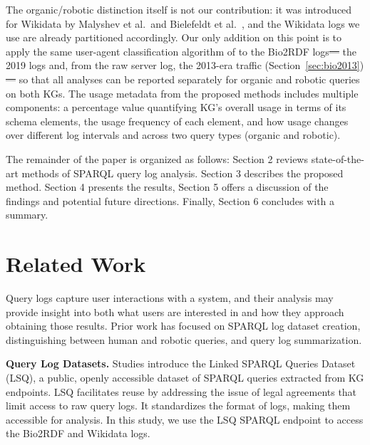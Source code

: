 \documentclass[sw]{iosart2x}
\providecommand{\DIFadd}[1]{{\protect\color{blue}\uwave{#1}}} %
\providecommand{\DIFdel}[1]{{\protect\color{red}\sout{#1}}} %
\providecommand{\DIFaddbegin}{} %
\providecommand{\DIFaddend}{} %
\providecommand{\DIFdelbegin}{} %
\providecommand{\DIFdelend}{} %
\providecommand{\DIFscaledelfig}{0.5}
\newlength{\DIFdelgraphicswidth} %
\newlength{\DIFdelgraphicsheight} %
\providecommand{\DIFaddincludegraphics}[2][]{{\color{blue}\fbox{\DIFOincludegraphics[#1]{#2}}}} %
\providecommand{\DIFdelincludegraphics}[2][]{%
\sbox{\DIFdelgraphicsbox}{\DIFOincludegraphics[#1]{#2}}%
\settoboxwidth{\DIFdelgraphicswidth}{\DIFdelgraphicsbox} %
\settoboxtotalheight{\DIFdelgraphicsheight}{\DIFdelgraphicsbox} %
\scalebox{\DIFscaledelfig}{%
\parbox[b]{\DIFdelgraphicswidth}{\usebox{\DIFdelgraphicsbox}\\[-\baselineskip] \rule{\DIFdelgraphicswidth}{0em}}\llap{\resizebox{\DIFdelgraphicswidth}{\DIFdelgraphicsheight}{%
\setlength{\unitlength}{\DIFdelgraphicswidth}%
\begin{picture}(1,1)%
\thicklines\linethickness{2pt} %
{\color[rgb]{1,0,0}\put(0,0){\framebox(1,1){}}}%
{\color[rgb]{1,0,0}\put(0,0){\line( 1,1){1}}}%
{\color[rgb]{1,0,0}\put(0,1){\line(1,-1){1}}}%
\end{picture}%
}\hspace*{3pt}}} %
} %
\DeclareRobustCommand{\DIFaddbegin}{\DIFOaddbegin \let\includegraphics\DIFaddincludegraphics} %
\DeclareRobustCommand{\DIFaddend}{\DIFOaddend \let\includegraphics\DIFOincludegraphics} %
\DeclareRobustCommand{\DIFdelbegin}{\DIFOdelbegin \let\includegraphics\DIFdelincludegraphics} %
\DeclareRobustCommand{\DIFdelend}{\DIFOaddend \let\includegraphics\DIFOincludegraphics} %
\begin{document}
The organic/robotic distinction itself is not our contribution: it was introduced for Wikidata by Malyshev et al.\ and Bielefeldt et al.\ \cite{malyshev2018getting,bielefeldt2018practical}, and the Wikidata logs we use are already partitioned accordingly. Our only addition on this point is to apply the same user-agent classification algorithm of \cite{bielefeldt2018practical} to the Bio2RDF logs\DIFdelbegin \DIFdel{--- }\DIFdelend \DIFaddbegin \DIFadd{, }\DIFaddend the 2019 logs and, from the raw server log, the 2013-era traffic (Section~\ref{sec:bio2013})\DIFdelbegin \DIFdel{--- }\DIFdelend \DIFaddbegin \DIFadd{, }\DIFaddend so that all analyses can be reported separately for organic and robotic queries on both KGs.
The usage metadata from the proposed methods includes multiple components: a percentage value quantifying KG's overall usage in terms of its schema elements, the usage frequency of each element, and how usage changes over different log intervals and across two query types (organic and robotic).

The remainder of the paper is organized as follows: Section 2 reviews state-of-the-art methods of SPARQL query log analysis. Section 3 describes the proposed method. Section 4 presents the results, Section 5 offers a discussion of the findings and potential future directions. Finally, Section 6 concludes with a summary.

\section{Related Work}\label{s2}

Query logs capture user interactions with a system, and their analysis may provide insight into both what users are interested in and how they approach obtaining those results.  Prior work has focused on SPARQL log dataset creation, distinguishing between human and robotic queries, and query log summarization.

\textbf{Query Log Datasets.}
Studies \cite{saleem2015lsq,stadler2024lsq} introduce the Linked SPARQL Queries Dataset (LSQ), a public, openly accessible dataset of SPARQL queries extracted from KG endpoints. LSQ facilitates reuse by addressing the issue of legal agreements that limit access to raw query logs. It standardizes the format of logs, making them accessible for analysis. In this study, we use the LSQ SPARQL endpoint to access the Bio2RDF and Wikidata logs.
\end{document}
